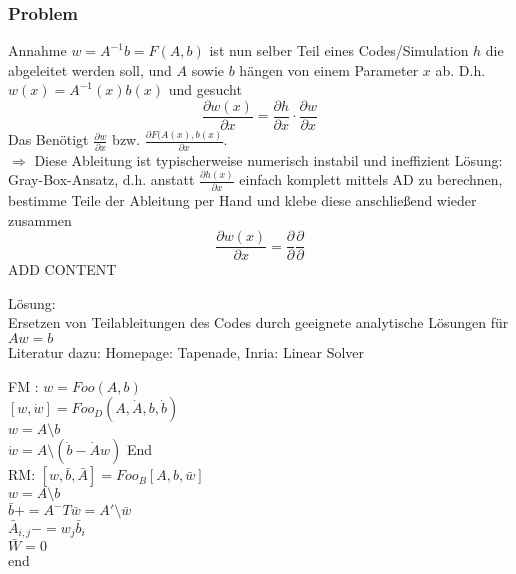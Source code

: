 \noindent
\subsubsection{Problem}
Annahme $w = A^{-1}b = F(A,b)$ ist nun selber Teil eines Codes/Simulation $h$ die abgeleitet werden soll, und $A$ sowie $b$ hängen von einem Parameter $x$ ab. D.h. $w(x)= A^{-1}(x)b(x)$ und gesucht
$$\frac{\partial w(x)}{\partial x} = \frac{\partial h}{\partial x}\cdot \frac{\partial w}{\partial x}$$
Das Benötigt $\frac{\partial w}{\partial x}$ bzw. $\frac{\partial F(A(x),b(x)}{\partial x}$.\\
$\Rightarrow$ Diese Ableitung ist typischerweise numerisch instabil und ineffizient
Lösung: Gray-Box-Ansatz, d.h. anstatt $\frac{\partial h(x)}{\partial x}$ einfach komplett mittels AD zu berechnen, bestimme Teile der Ableitung per Hand und klebe diese anschließend wieder zusammen
$$\frac{\partial w(x)}{\partial x} = \frac{\partial}{\partial} \frac{\partial}{\partial}$$
ADD CONTENT

Lösung:\\
Ersetzen von Teilableitungen des Codes durch geeignete analytische Lösungen für $Aw = b$\\
Literatur dazu: Homepage: Tapenade, Inria: Linear Solver

FM : $w = Foo(A,b)$\\
$[w, \dot{w}]=Foo_D(A,\dot{A},b,\dot{b})$\\
$w = A\setminus b$\\
$\dot{w}=A\setminus (\dot{b}-\dot{A}w)$
End\\

RM: $[w, \bar{b},\bar{A}] = Foo_B[A,b,\bar{w}]$\\
$w= A\setminus b$\\
$\bar{b}+ =A^-T\bar{w}= A' \setminus \bar{w}$\\
$\bar{A}_{i,j}-= w_j\bar{b}_i$\\
$\bar{W}=0$\\
end
